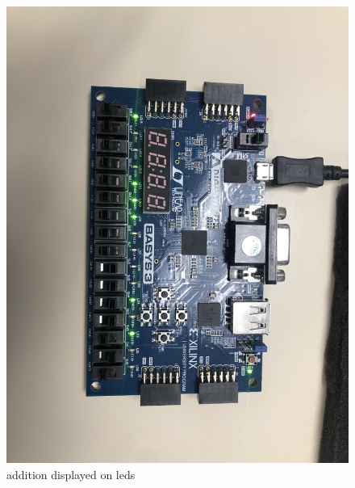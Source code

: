 \documentclass[11pt]{article}
\begin{document}
\begin{figure}[ht]\centering
	\includegraphics[width= \textwidth ]{bb3.png}
	\caption{addition displayed on leds}
	\label{fig: bb3}
\end{figure}
\end{document}
